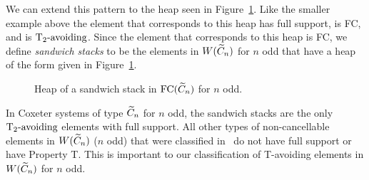 We can extend this pattern to the heap seen in Figure~\ref{fig:stacksandstack}. Like the smaller example above the element that corresponds to this heap has full support, is FC, and is $\operatorname{T_2-\mathrm{avoiding}}$. Since the element that corresponds to this heap is FC, we define \emph{sandwich stacks} to be the elements in $W(\widetilde{C}_n)$ for $n$ odd that have a heap of the form given in Figure~\ref{fig:stacksandstack}.

\begin{figure}[h!] \centering
{}	
\caption{Heap of a sandwich stack in $\mathrm{FC}(\widetilde{C}_n)$ for $n$ odd.}\label{fig:stacksandstack}
\end{figure}

\begin{remark}\label{rem:noncancel}
	 In Coxeter systems of type $\widetilde{C}_n$ for $n$ odd, the sandwich stacks are the only $\operatorname{T_2-\mathrm{avoiding}}$ elements with full support. All other types of non-cancellable elements in $W(\widetilde{C}_n)$ ($n$ odd) that were classified in~\cite{Ernst2010} do not have full support or have Property T. This is important to our classification of T-avoiding elements in $W(\widetilde{C}_n)$ for $n$ odd.
\end{remark}



